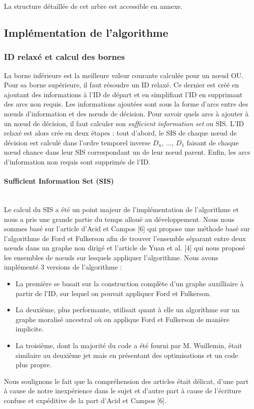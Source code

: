 \documentclass[12pt]{article}
\newcommand{\subsubsubsection}[1]{\paragraph{#1}\mbox{}\\}
\begin{document}
La structure détaillée de cet arbre est accessible en annexe.

\subsection{Implémentation de l'algorithme}

\subsubsection{ID relaxé et calcul des bornes}
La borne inférieure est la meilleure valeur courante calculée pour un nœud OU.
Pour sa borne supérieure, il faut résoudre un ID relaxé. 
Ce dernier est créé en ajoutant des informations à l'ID de départ et en simplifiant l'ID en supprimant des arcs non requis. 
\bigbreak
Les informations ajoutées sont sous la forme d'arcs entre des nœuds d'information et des nœuds de décision. Pour savoir quels arcs à ajouter à un nœud de décision, il faut calculer son \textit{sufficient information set} ou SIS.
\bigbreak
L'ID relaxé est alors crée en deux étapes :
tout d'abord, le SIS de chaque nœud de décision est calculé dans l'ordre temporel inverse $D_n$, ..., $D_1$ faisant de chaque nœud chance dans leur SIS correspondant un de leur nœud parent.
Enfin, les arcs d'information non requis sont supprimés de l'ID.

\subsubsubsection{Sufficient Information Set (SIS)}
Le calcul du SIS a été un point majeur de l'implémentation de l'algorithme et nous a pris une grande partie du temps alloué au développement.
\bigbreak
Nous nous sommes basé sur l'article d'Acid et Campos [6] qui propose une méthode basé sur l'algorithme de Ford et Fulkerson afin de trouver l'ensemble séparant entre deux nœuds dans un graphe non dirigé et l'article de Yuan et al. [4] qui nous proposé les ensembles de nœuds sur lesquels appliquer l'algorithme.
\bigbreak
Nous avons implémenté 3 versions de l'algorithme :
\begin{itemize}
    \item La première se basait sur la construction complète d'un graphe auxilliaire à partir de l'ID, sur lequel on pouvait appliquer Ford et Fulkerson.
    \item La deuxième, plus performante, utilisait quant à elle un algorithme sur un graphe moralisé ancestral où on applique Ford et Fulkerson de manière implicite.
    \item La troisième, dont la majorité du code a été fourni par M. Wuillemin, était similaire au deuxième jet mais en présentant des optimisations et un code plus propre.
\end{itemize}
Nous soulignons le fait que la compréhension des articles était délicat, d'une part à cause de notre inexpérience dans le sujet et d'autre part à cause de l'écriture confuse et expéditive de la part d'Acid et Campos [6].
\end{document}
